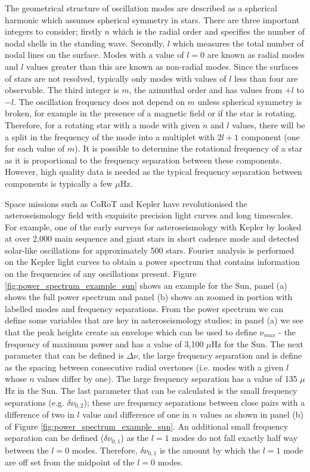 The geometrical structure of oscillation modes are described as a spherical harmonic which assumes spherical symmetry in stars. There are three important integers to consider; firstly $n$ which is the radial order and specifies the number of nodal shells in the standing wave. Secondly, $l$ which measures the total number of nodal lines on the surface. Modes with a value of $l=0$ are known as radial modes and $l$ values greater than this are known as non-radial modes. Since the surfaces of stars are not resolved, typically only modes with values of $l$ less than four are observable. The third integer is $m$, the azimuthal order and has values from $+l$ to $-l$. The oscillation frequency does not depend on $m$ unless spherical symmetry is broken, for example in the presence of a magnetic field or if the star is rotating. Therefore, for a rotating star with a mode with given $n$ and $l$ values, there will be a split in the frequency of the mode into a multiplet with $2l + 1$ component (one for each value of $m$). It is possible to determine the rotational frequency of a star as it is proportional to the frequency separation between these components. However, high quality data is needed as the typical frequency separation between components is typically a few $\mu$Hz.

Space missions such as CoRoT and Kepler have revolutionised the asteroseismology field with exquisite precision light curves and long timescales. For example, one of the early surveys for asteroseismology with Kepler by \citet{Chaplin_etal_2011} looked at over 2,000 main sequence and giant stars in short cadence mode and detected solar-like oscillations for approximately 500 stars. Fourier analysis is performed on the Kepler light curves to obtain a power spectrum that contains information on the frequencies of any oscillations present. Figure \ref{fig:power_spectrum_example_sun} shows an example for the Sun, panel (a) shows the full power spectrum and panel (b) shows an zoomed in portion with labelled modes and frequency separations. From the power spectrum we can define some variables that are key in asteroseismology studies; in panel (a) we see that the peak heights create an envelope which can be used to define $\nu_{max}$ - the frequency of maximum power and has a value of 3,100 $\mu$Hz for the Sun. The next parameter that can be defined is $\Delta \nu$, the large frequency separation and is define as the spacing between consecutive radial overtones (i.e. modes with a given $l$ whose $n$ values differ by one). The large frequency separation has a value of 135 $\mu$Hz in the Sun. The last parameter that can be calculated is the small frequency separations (e.g. $\delta \nu_{0,2}$); these are frequency separations between close pairs with a difference of two in $l$ value and difference of one in $n$ values as shown in panel (b) of Figure \ref{fig:power_spectrum_example_sun}. An additional small frequency separation can be defined ($\delta \nu_{0,1}$) as the $l=1$ modes do not fall exactly half way between the $l=0$ modes. Therefore, $\delta \nu_{0,1}$ is the amount by which the $l=1$ mode are off set from the midpoint of the $l=0$ modes.


